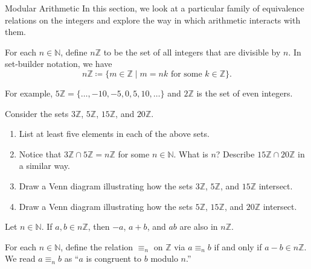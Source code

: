 \begin{section}{Modular Arithmetic}\label{sec:ModularArithmetic}
In this section, we look at a particular family of equivalence relations on the integers and explore the way in which arithmetic interacts with them.

\begin{definition}
For each $n\in \mathbb{N}$, define $n\mathbb{Z}$ to be the set of all integers that are divisible by $n$. In set-builder notation, we have
\[
\boxed{n\mathbb{Z} \coloneqq  \{m \in \mathbb{Z}  \mid m = nk \text{ for some } k \in \mathbb{Z}\}}.
\]
\end{definition}

For example, $5\mathbb{Z} = \{ \ldots,-10,-5,0,5,10,\ldots\}$ and $2\mathbb{Z}$ is the set of even integers. 


\begin{problem} 
Consider the sets $3 \mathbb{Z}$, $5 \mathbb{Z}$, $15 \mathbb{Z}$, and $20 \mathbb{Z}$.
\begin{enumerate}[label=\textrm{(\alph*)}]
\item List at least five elements in each of the above sets.
\item Notice that $3 \mathbb{Z} \cap5 \mathbb{Z} = n\mathbb{Z}$ for some $n\in \mathbb{N}$. What is $n$? Describe $15\mathbb{Z}\cap 20 \mathbb{Z}$ in a similar way.
\item Draw a Venn diagram illustrating how the sets $3\mathbb{Z}$, $5\mathbb{Z}$, and $15\mathbb{Z}$ intersect.  
\item Draw a Venn diagram illustrating how the sets $5\mathbb{Z}$, $15\mathbb{Z}$, and $20\mathbb{Z}$ intersect.
\end{enumerate}
\end{problem}

\begin{theorem}
Let $n\in \mathbb{N}$. If $a,b \in n\mathbb{Z}$, then $-a$, $a+b$, and $ab$ are also in $n\mathbb{Z}$.
\end{theorem}

\begin{definition}\label{def:modulo}
For each  $n\in \mathbb{N}$,  define the relation $\boxed{\equiv_n}$ on $\mathbb{Z}$ via $a\equiv_n b$ if and only if $a-b \in n\mathbb{Z}$. We read $a\equiv_n b$ as ``$a$ is congruent to $b$ modulo $n$.''
\end{definition}


\end{section}
